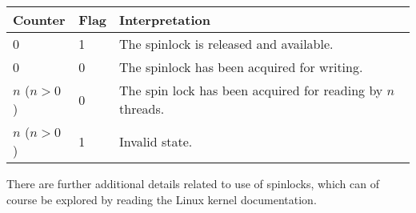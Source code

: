 \begin{center}
	\begin{tabular}{l|l|l}
		\textbf{Counter} & \textbf{Flag} & \textbf{Interpretation}                                     \\\hline
		0                & 1             & The spinlock is released and available.                     \\
		0                & 0             & The spinlock has been acquired for writing.                 \\
		$n$ ($n > 0$)    & 0             & The spin lock has been acquired for reading by $n$ threads. \\
		$n$ ($n > 0$)    & 1             & Invalid state.                                              \\
	\end{tabular}
\end{center}

There are further additional details related to use of spinlocks, which can of course be explored by reading the Linux kernel documentation.




